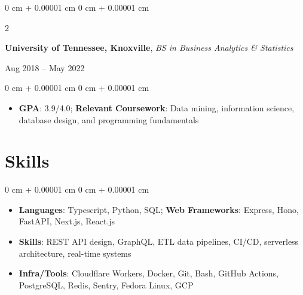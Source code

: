 \documentclass[10pt, letterpaper]{article}
\newenvironment{highlights}{
		\begin{itemize}[
        topsep=0.10 cm,
        parsep=0.10 cm,
        partopsep=0pt,
        itemsep=0pt,
        leftmargin=0 cm + 10pt
						]
				}{
		\end{itemize}
} %
\newenvironment{onecolentry}{
		\begin{adjustwidth}{
						0 cm + 0.00001 cm
    }{
						0 cm + 0.00001 cm
    }
		}{
		\end{adjustwidth}
} %
\newenvironment{twocolentry}[2][]{
		\onecolentry
		\def\secondColumn{#2}
		\setcolumnwidth{\fill, 4.5 cm}
		\begin{paracol}{2}
		}{
    \switchcolumn \raggedleft \secondColumn
		\end{paracol}
		\endonecolentry
} %
\begin{document}
\begin{twocolentry}{Aug 2018 – May 2022}
		\textbf{University of Tennessee, Knoxville}, \textit{BS in Business Analytics \& Statistics}
\end{twocolentry}
\vspace{0.10 cm}
\begin{onecolentry}
		\begin{highlights}
		\item \textbf{GPA}: 3.9/4.0; \textbf{Relevant Coursework}: Data mining, information science,
				database design, and programming fundamentals
		\end{highlights}
\end{onecolentry}

\section{Skills}

\begin{onecolentry}
		\begin{highlights}
		\item \textbf{Languages}: Typescript, Python, SQL; \textbf{Web
				Frameworks}: Express, Hono, FastAPI, Next.js, React.js
		\item \textbf{Skills}: REST API design, GraphQL, ETL data pipelines, CI/CD, serverless
				architecture, real-time systems
		\item \textbf{Infra/Tools}: Cloudflare Workers, Docker, Git, Bash, GitHub Actions,
				PostgreSQL, Redis, Sentry, Fedora Linux, GCP
		\end{highlights}
\end{onecolentry}
\end{document}
